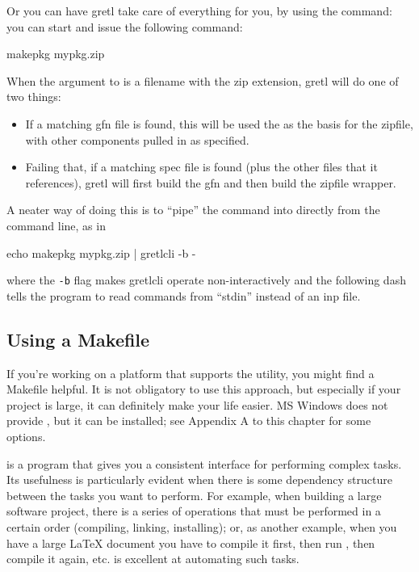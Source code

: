 \documentclass[oneside]{book}
\begin{document}
Or you can have gretl take care of everything for you, by using the
 command: you can start  and issue the
following command:
%
\begin{code}
makepkg mypkg.zip
\end{code}
%
When the argument to  is a filename with the \textsf{zip}
extension, gretl will do one of two things:
\begin{itemize}
\item If a matching \textsf{gfn} file is found, this will be used the
  as the basis for the zipfile, with other components pulled in as
  specified.
\item Failing that, if a matching \textsf{spec} file is found (plus
  the other files that it references), gretl will first build the
  \textsf{gfn} and then build the zipfile wrapper.
\end{itemize}

A neater way of doing this is to ``pipe'' the  command
into  directly from the command line, as in
\begin{code}
echo makepkg mypkg.zip | gretlcli -b -
\end{code}
%
where the \texttt{-b} flag makes \textsf{gretlcli} operate
non-interactively and the following dash tells the program to read
commands from ``stdin'' instead of an \textsf{inp} file.

\subsection{Using a Makefile}
\label{sec:using-make}

If you're working on a platform that supports the  utility,
you might find a Makefile helpful. It is not obligatory to use this
approach, but especially if your project is large, it can definitely
make your life easier. MS Windows does not provide , but it
can be installed; see Appendix A to this chapter for some options.

 is a program that gives you a consistent interface for
performing complex tasks. Its usefulness is particularly evident when
there is some dependency structure between the tasks you want to
perform. For example, when building a large software project, there is
a series of operations that must be performed in a certain order
(compiling, linking, installing); or, as another example, when you
have a large \LaTeX{} document you have to compile it first, then run
\BibTeX{}, then compile it again, etc.  is excellent at
automating such tasks.
\end{document}
